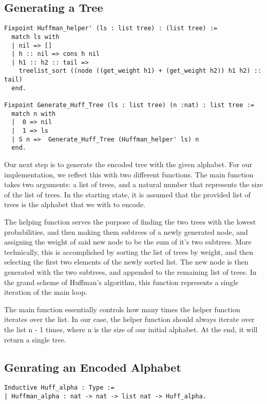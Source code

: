 \documentclass{llncs}
\begin{document}
\newpage

\subsection{Generating a Tree}

\begin{lstlisting}
Fixpoint Huffman_helper' (ls : list tree) : (list tree) :=
  match ls with
  | nil => [] 
  | h :: nil => cons h nil
  | h1 :: h2 :: tail =>
    treelist_sort ((node ((get_weight h1) + (get_weight h2)) h1 h2) :: tail)
  end.

Fixpoint Generate_Huff_Tree (ls : list tree) (n :nat) : list tree :=
  match n with
  |  0 => nil
  |  1 => ls
  | S n =>  Generate_Huff_Tree (Huffman_helper' ls) n
  end.
\end{lstlisting}

Our next step is to generate the encoded tree with the given alphabet. For our implementation, we reflect this with two different functions. The main function takes two arguments: a list of trees, and a natural number that represents the size of the list of trees. In the starting state, it is assumed that the provided list of trees is the alphabet that we with to encode.

The helping function serves the purpose of finding the two trees with the lowest probabilities, and then making them subtrees of a newly generated node, and assigning the weight of said new node to be the sum of it’s two subtrees.  More technically, this is accomplished by sorting the list of trees by weight, and then selecting the first two elements of the newly sorted list. The new node is then generated with the two subtrees, and appended to the remaining list of trees. In the grand scheme of Huffman’s algorithm, this function represents a single iteration of the main loop.

The main function essentially controls how many times the helper function iterates over the list. In our case, the helper function should always iterate over the list  n - 1 times, where n is the size of our initial alphabet. At the end, it will return a single tree.


\subsection{Genrating an Encoded Alphabet}

\begin{lstlisting}
Inductive Huff_alpha : Type :=
| Huffman_alpha : nat -> nat -> list nat -> Huff_alpha.
\end{lstlisting}
\end{document}
